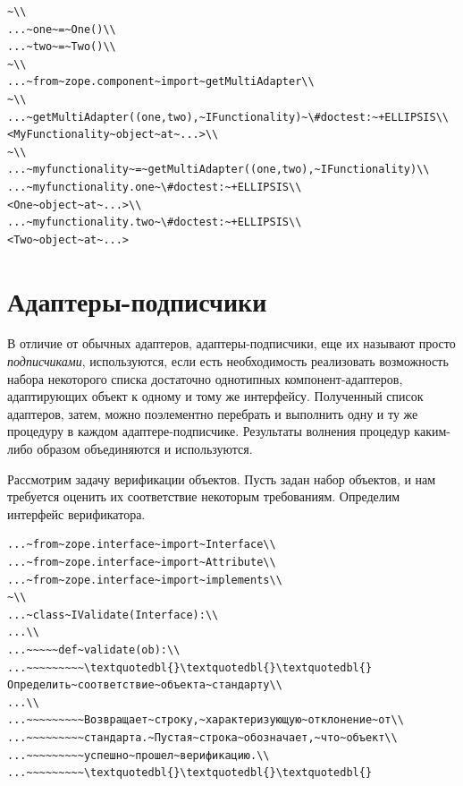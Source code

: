 \documentclass[a4paper,openany,twoside,draft]{book}
\providecommand*{\DUroletitlereference}[1]{\textsl{#1}}
\begin{document}
\begin{verbatim}
~\\
...~one~=~One()\\
...~two~=~Two()\\
~\\
...~from~zope.component~import~getMultiAdapter\\
~\\
...~getMultiAdapter((one,two),~IFunctionality)~\#doctest:~+ELLIPSIS\\
<MyFunctionality~object~at~...>\\
~\\
...~myfunctionality~=~getMultiAdapter((one,two),~IFunctionality)\\
...~myfunctionality.one~\#doctest:~+ELLIPSIS\\
<One~object~at~...>\\
...~myfunctionality.two~\#doctest:~+ELLIPSIS\\
<Two~object~at~...>
\end{verbatim}


\section{Адаптеры-подписчики%
  \label{id46}%
}

В отличие от обычных адаптеров, адаптеры-подписчики, еще их называют
просто \DUroletitlereference{подписчиками}, используются, если есть необходимость
реализовать возможность набора некоторого списка достаточно однотипных
компонент-адаптеров, адаптирующих объект к одному и тому же
интерфейсу.  Полученный список адаптеров, затем, можно поэлементно
перебрать и выполнить одну и ту же процедуру в каждом
адаптере-подписчике.  Результаты волнения процедур каким-либо образом
объединяются и используются.

Рассмотрим задачу верификации объектов.  Пусть задан набор объектов, и нам
требуется оценить их соответствие некоторым требованиям.  Определим
интерфейс верификатора.

\begin{verbatim}
...~from~zope.interface~import~Interface\\
...~from~zope.interface~import~Attribute\\
...~from~zope.interface~import~implements\\
~\\
...~class~IValidate(Interface):\\
...\\
...~~~~~def~validate(ob):\\
...~~~~~~~~~\textquotedbl{}\textquotedbl{}\textquotedbl{}Определить~соответствие~объекта~стандарту\\
...\\
...~~~~~~~~~Возвращает~строку,~характеризующую~отклонение~от\\
...~~~~~~~~~стандарта.~Пустая~строка~обозначает,~что~объект\\
...~~~~~~~~~успешно~прошел~верификацию.\\
...~~~~~~~~~\textquotedbl{}\textquotedbl{}\textquotedbl{}
\end{verbatim}
\end{document}
